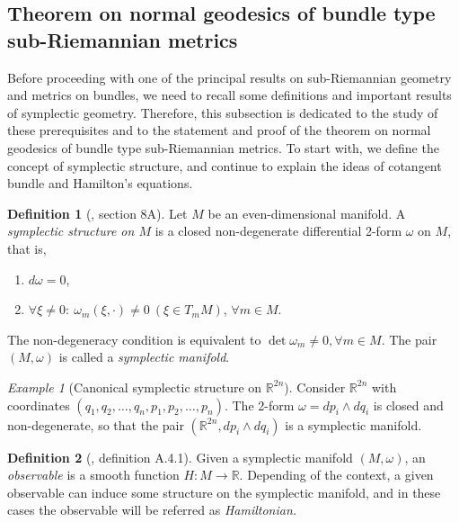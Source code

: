 \documentclass[12pt, letterpaper, reqno]{amsart}
\theoremstyle{definition}
\newtheorem{df}{Definition}
\theoremstyle{plain}
\theoremstyle{remark}
\newtheorem{ex}{Example}
\begin{document}
\subsection{Theorem on normal geodesics of bundle type sub-Riemannian metrics}
Before proceeding with one of the principal results on sub-Riemannian geometry and metrics on bundles, we need to recall some definitions and important results of symplectic geometry. Therefore, this subsection is dedicated to the study of these prerequisites and to the statement and proof of the theorem on normal geodesics of bundle type sub-Riemannian metrics. To start with, we define the concept of symplectic structure, and continue to explain the ideas of cotangent bundle and Hamilton's equations.
\begin{df}[\cite{arnol2013mathematical}, section 8A]
	Let $ M $ be an even-dimensional manifold. A \textit{symplectic structure on $ M $ } is a closed non-degenerate differential 2-form $ \omega $ on $ M $, that is, 
	\begin{enumerate}
		\item $ d\omega=0 $,
		\item $\forall \xi \neq 0: \ \omega_m(\xi,\cdot)\neq0 \ (\xi\in T_m M)$, $ \forall m \in M. $  
	  
	\end{enumerate}
	The non-degeneracy condition is equivalent to $ \operatorname{det} \omega_m\neq 0, \forall m\in M $. The pair $ (M,\omega) $ is called a \textit{symplectic manifold}. 
\end{df}

\begin{ex}[Canonical symplectic structure on $ \mathbb{R}^{2n}$]
	Consider $ \mathbb{R}^{2n} $ with coordinates $ (q_1,q_2,\dots,q_n,p_1,p_2,\dots,p_n) $. The 2-form $ \omega = dp_i\wedge dq_i $ is closed and non-degenerate, so that the pair $ ( \mathbb{R}^{2n}, dp_i\wedge dq_i) $ is a symplectic manifold.  
\end{ex}

\begin{df}[\cite{montgomery2002tour}, definition A.4.1]
	Given a symplectic manifold  $ (M,\omega) $, an \textit{observable} is a smooth function $ H: M \rightarrow \mathbb{R}. $ Depending of the context, a given observable can induce some structure on the symplectic manifold, and in these cases the observable will be referred as \textit{Hamiltonian.} 
\end{df}
\end{document}
